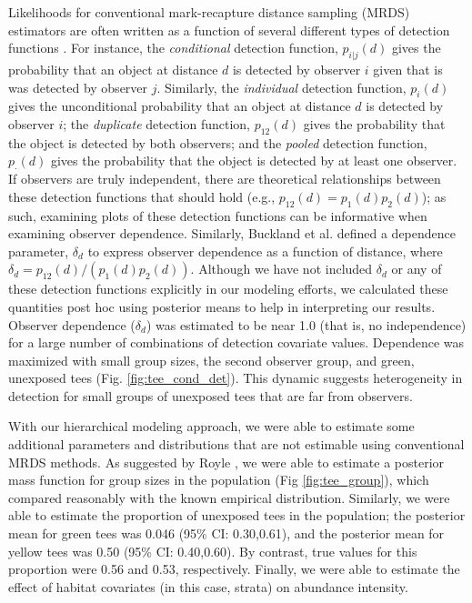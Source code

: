 \documentclass[10pt]{article}
\begin{document}
Likelihoods for conventional mark-recapture distance sampling (MRDS) estimators are often written as a function of several different types of detection functions \cite{LaakeBorchers2004}.  For instance, the {\it conditional} detection function, $p_{i|j}(d)$ gives the probability that an object at distance $d$ is detected by observer $i$ given that is was detected by observer $j$. Similarly, the {\it individual} detection function, $p_i(d)$ gives the unconditional probability that an object at distance $d$ is detected by observer $i$; the {\it duplicate} detection function, $p_{12}(d)$ gives the probability that the object is detected by both observers; and the {\it pooled} detection function, $p_\cdot(d)$ gives the probability that the object is detected by at least one observer.  If observers are truly independent, there are theoretical relationships between these detection functions that should hold (e.g., $p_{12}(d)=p_1(d)p_2(d)$); as such, examining plots of these detection functions can be informative when examining observer dependence.  Similarly, Buckland et al. \cite{BucklandEtAl2010} defined a dependence parameter, $\delta_d$ to express observer dependence as a function of distance, where $\delta_d=p_{12}(d)/(p_1(d)p_2(d))$.  Although we have not included $\delta_d$ or any of these detection functions explicitly in our modeling efforts, we calculated these quantities post hoc using posterior means to help in interpreting our results.  Observer dependence ($\delta_d$) was estimated to be near 1.0 (that is, no independence) for a large number of combinations of detection covariate values.  Dependence was maximized with small group sizes, the second observer group, and green, unexposed tees (Fig. \ref{fig:tee_cond_det}).  This dynamic suggests heterogeneity in detection for small groups of unexposed tees that are far from observers.

With our hierarchical modeling approach, we were able to estimate some additional parameters and distributions that are not estimable using conventional MRDS methods.  As suggested by Royle  \cite{Royle2008}, we were able to
estimate a posterior mass function for group sizes in the population (Fig \ref{fig:tee_group}), which compared reasonably with the known empirical distribution.  Similarly, we were able to estimate the proportion of unexposed tees in the population; the posterior mean for green tees was 0.046 (95\% CI: 0.30,0.61), and the posterior mean for yellow tees was 0.50 (95\% CI: 0.40,0.60).  By contrast, true values for this proportion were 0.56 and 0.53, respectively.  Finally, we were able to estimate the effect of habitat covariates (in this case, strata) on abundance intensity.
\end{document}
